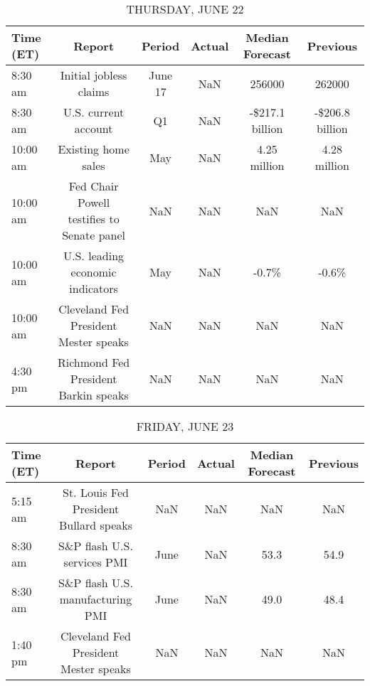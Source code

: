 \documentclass{article}%
\begin{document}
%


\begin{table}[htbp]%
\caption{THURSDAY, JUNE 22}%
\centering%
\begin{adjustbox}{width=1\textwidth}%
\begin{tabular}{lccccc}
\toprule
Time (ET) &                                     Report &  Period & Actual & Median Forecast &        Previous \\
\midrule
  8:30 am &                     Initial jobless claims & June 17 &    NaN &          256000 &          262000 \\
  8:30 am &                       U.S. current account &      Q1 &    NaN & -\$217.1 billion & -\$206.8 billion \\
 10:00 am &                        Existing home sales &     May &    NaN &    4.25 million &    4.28 million \\
 10:00 am & Fed Chair Powell testifies to Senate panel &     NaN &    NaN &             NaN &             NaN \\
 10:00 am &           U.S. leading economic indicators &     May &    NaN &           -0.7\% &           -0.6\% \\
 10:00 am &      Cleveland Fed President Mester speaks &     NaN &    NaN &             NaN &             NaN \\
  4:30 pm &       Richmond Fed President Barkin speaks &     NaN &    NaN &             NaN &             NaN \\
\bottomrule
\end{tabular}
%
\end{adjustbox}%
\end{table}

%


\begin{table}[htbp]%
\caption{FRIDAY, JUNE 23}%
\centering%
\begin{adjustbox}{width=1\textwidth}%
\begin{tabular}{lccccc}
\toprule
Time (ET) &                                 Report & Period & Actual & Median Forecast & Previous \\
\midrule
  5:15 am & St. Louis Fed President Bullard speaks &    NaN &    NaN &             NaN &      NaN \\
  8:30 am &            S\&P flash U.S. services PMI &   June &    NaN &            53.3 &     54.9 \\
  8:30 am &       S\&P flash U.S. manufacturing PMI &   June &    NaN &            49.0 &     48.4 \\
  1:40 pm &  Cleveland Fed President Mester speaks &    NaN &    NaN &             NaN &      NaN \\
\bottomrule
\end{tabular}
%
\end{adjustbox}%
\end{table}
\end{document}
